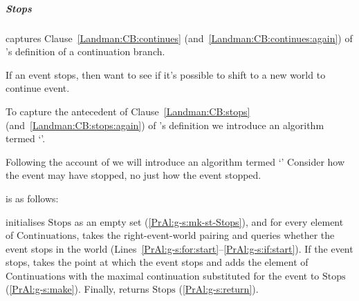 \subparagraph{Stops}

\begin{note}
  \AlgAC{} captures Clause~\ref{Landman:CB:continues} (and~\ref{Landman:CB:continues:again}) of \citeauthor{Landman:1992wh}'s definition of a continuation branch.

  If an event stops, then want to see if it's possible to shift to a new world to continue event.

  To capture the antecedent of Clause~\ref{Landman:CB:stops} (and~\ref{Landman:CB:stops:again}) of \citeauthor{Landman:1992wh}'s definition we introduce an algorithm termed `\AlgGetStops{}'.

  Following the account of \AlgGetStops{} we will introduce an algorithm termed `\AlgGetPStops{}'
  Consider how the event may have stopped, no just how the event stopped.
\end{note}

\begin{note}[\AlgGetStops{}]
  \AlgGetStops{} is as follows:

  \begin{algorithm}[H]
    \label{PrAl:g-s}
    \caption{\AlgGetStops{}}
    \SetAlgoLined
    \DontPrintSemicolon
  \end{algorithm}

  \AlgGetStops{} initialises \(\text{Stops}\) as an empty set (\autoref{PrAl:g-s:mk-st-Stops}), and for every element of \(\text{Continuations}\), \AlgGetStops{} takes the right-event-world pairing and queries whether the event stops in the world (Lines~\ref{PrAl:g-s:for:start}--\ref{PrAl:g-s:if:start}).
  If the event stops, \AlgGetStops{} takes the point at which the event stops and adds the element of \(\text{Continuations}\) with the maximal continuation substituted for the event to \(\text{Stops}\) (\autoref{PrAl:g-s:make}).
  Finally, \AlgGetStops{} returns \(\text{Stops}\) (\autoref{PrAl:g-s:return}).
\end{note}

